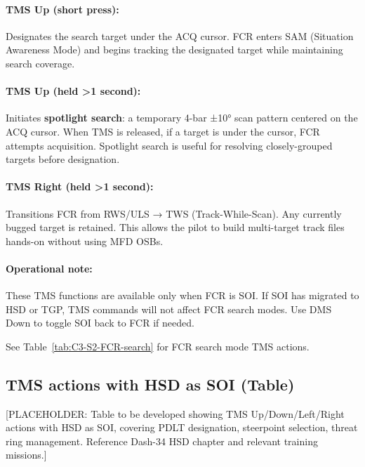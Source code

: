 \documentclass[11pt, a4paper, twoside]{report}
\begin{document}
\paragraph{TMS Up (short press):}
Designates the search target under the ACQ cursor. FCR enters SAM (Situation Awareness Mode) and begins tracking the designated target while maintaining search coverage.

\paragraph{TMS Up (held >1 second):}
Initiates \textbf{spotlight search}: a temporary 4-bar ±10° scan pattern centered on the ACQ cursor. When TMS is released, if a target is under the cursor, FCR attempts acquisition. Spotlight search is useful for resolving closely-grouped targets before designation.

\paragraph{TMS Right (held >1 second):}
Transitions FCR from RWS/ULS → TWS (Track-While-Scan). Any currently bugged target is retained. This allows the pilot to build multi-target track files hands-on without using MFD OSBs.

\paragraph{Operational note:}
These TMS functions are available only when FCR is SOI. If SOI has migrated to HSD or TGP, TMS commands will not affect FCR search modes. Use DMS Down to toggle SOI back to FCR if needed.

See Table~\ref{tab:C3-S2-FCR-search} for FCR search mode TMS actions.

\subsection{TMS actions with HSD as SOI (Table)}
\label{sec:C3-S2-S3}

[PLACEHOLDER: Table to be developed showing TMS Up/Down/Left/Right actions with HSD as SOI, covering PDLT designation, steerpoint selection, threat ring management. Reference Dash-34 HSD chapter and relevant training missions.]
\end{document}
